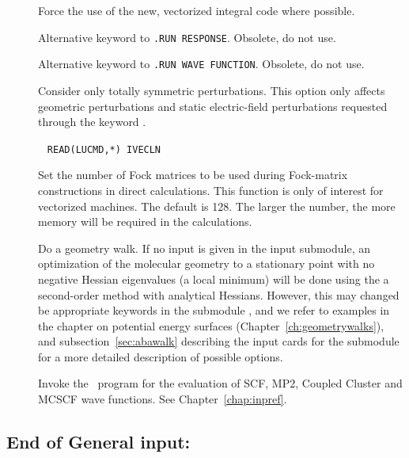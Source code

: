 \begin{description}
\item[] Force the use of the new, vectorized integral code where possible.

\item[] Alternative keyword to \verb|.RUN RESPONSE|. Obsolete, do not use.

\item[] Alternative keyword to \verb|.RUN WAVE FUNCTION|. Obsolete, do not use.

\item[] Consider only totally symmetric
perturbations.
This option only affects geometric perturbations and static
electric-field perturbations requested through the keyword .

\item[]\verb| |
\newline
\verb|READ(LUCMD,*) IVECLN|

Set the number of Fock matrices to be used during Fock-matrix constructions in 
direct calculations. This function is only of interest for vectorized machines.
The default is 128. The larger the number, the more memory will be required 
in the calculations.

\item[] 
Do a geometry walk. If no
input is given in the
 input submodule, an optimization of the molecular
geometry to a stationary point with no
negative Hessian eigenvalues (a
local minimum) will be done using the a second-order method with analytical Hessians. However, this may changed be appropriate
keywords in the submodule , and we refer to examples in
the chapter on potential energy surfaces
(Chapter~\ref{ch:geometrywalks}), and  subsection~\ref{sec:abawalk}
describing the input cards for the  submodule for a more
detailed description of possible options.

\item[]

Invoke the \sir\ program for the evaluation of SCF, MP2, Coupled Cluster and MCSCF
wave
functions. See Chapter~\ref{chap:inpref}.
\end{description}

\subsection{End of General input: }


